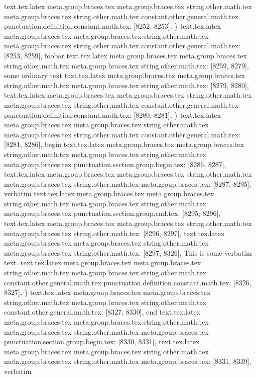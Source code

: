 {{{{{{{{{{{{{{{{{{{{{{{{{{{{{{{{{{{{{{{{{{{{{{{{{{{{{{{{{{{{{{{{{{{{{{{{{{{{{{{{{{{{{{{{{{{{{{{{{{{{{{{{{{{{{{{{{{{{{{{{{{{{{{{{{{{{{{{{{{{{{{{{{{{{{{{{{{{{{{{{{{{{{{{{{{{{{{{{{{{{{{{{{{{{{{{{{{{{{{{{{{{{{{{{{{{{{{{{{{{{{{{{{{{{{{{{{{{{{{{{{{}
text.tex.latex meta.group.braces.tex meta.group.braces.tex string.other.math.tex meta.group.braces.tex string.other.math.tex constant.other.general.math.tex punctuation.definition.constant.math.tex: [8252, 8253], {\}
text.tex.latex meta.group.braces.tex meta.group.braces.tex string.other.math.tex meta.group.braces.tex string.other.math.tex constant.other.general.math.tex: [8253, 8259], {foobar}
text.tex.latex meta.group.braces.tex meta.group.braces.tex string.other.math.tex meta.group.braces.tex string.other.math.tex: [8259, 8279], { some ordinary text
}
text.tex.latex meta.group.braces.tex meta.group.braces.tex string.other.math.tex meta.group.braces.tex string.other.math.tex: [8279, 8280], {
}
text.tex.latex meta.group.braces.tex meta.group.braces.tex string.other.math.tex meta.group.braces.tex string.other.math.tex constant.other.general.math.tex punctuation.definition.constant.math.tex: [8280, 8281], {\}
text.tex.latex meta.group.braces.tex meta.group.braces.tex string.other.math.tex meta.group.braces.tex string.other.math.tex constant.other.general.math.tex: [8281, 8286], {begin}
text.tex.latex meta.group.braces.tex meta.group.braces.tex string.other.math.tex meta.group.braces.tex string.other.math.tex meta.group.braces.tex punctuation.section.group.begin.tex: [8286, 8287], {{}
text.tex.latex meta.group.braces.tex meta.group.braces.tex string.other.math.tex meta.group.braces.tex string.other.math.tex meta.group.braces.tex: [8287, 8295], {verbatim}
text.tex.latex meta.group.braces.tex meta.group.braces.tex string.other.math.tex meta.group.braces.tex string.other.math.tex meta.group.braces.tex punctuation.section.group.end.tex: [8295, 8296], {}}
text.tex.latex meta.group.braces.tex meta.group.braces.tex string.other.math.tex meta.group.braces.tex string.other.math.tex: [8296, 8297], {
}
text.tex.latex meta.group.braces.tex meta.group.braces.tex string.other.math.tex meta.group.braces.tex string.other.math.tex: [8297, 8326], {	This is some verbatim text.
}
text.tex.latex meta.group.braces.tex meta.group.braces.tex string.other.math.tex meta.group.braces.tex string.other.math.tex constant.other.general.math.tex punctuation.definition.constant.math.tex: [8326, 8327], {\}
text.tex.latex meta.group.braces.tex meta.group.braces.tex string.other.math.tex meta.group.braces.tex string.other.math.tex constant.other.general.math.tex: [8327, 8330], {end}
text.tex.latex meta.group.braces.tex meta.group.braces.tex string.other.math.tex meta.group.braces.tex string.other.math.tex meta.group.braces.tex punctuation.section.group.begin.tex: [8330, 8331], {{}
text.tex.latex meta.group.braces.tex meta.group.braces.tex string.other.math.tex meta.group.braces.tex string.other.math.tex meta.group.braces.tex: [8331, 8339], {verbatim}
}}}}}}}}}}}}}}}}}}}}}}}}}}}}}}}}}}}}}}}}}}}}}}}}}}}}}}}}}}}}}}}}}}}}}}}}}}}}}}}}}}}}}}}}}}}}}}}}}}}}}}}}}}}}}}}}}}}}}}}}}}}}}}}}}}}}}}}}}}}}}}}}}}}}}}}}}}}}}}}}}}}}}}}}}}}}}}}}}}}}}}}}}}}}}}}}}}}}}}}}}}}}}}}}}}}}}}}}}}}}}}}}}}}}}}}}}}}}}}}}}}}}}
